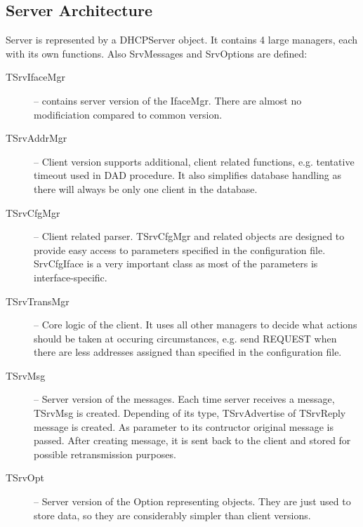 \subsection{Server Architecture}

Server is represented by a DHCPServer object. It contains 4 large
managers, each with its own functions. Also SrvMessages and SrvOptions
are defined:
\begin{description}
\item[TSrvIfaceMgr] -- contains server version of the IfaceMgr. There
  are almost no modificiation compared to common version.

\item[TSrvAddrMgr] -- Client version supports additional, client
  related functions, e.g. tentative timeout used in DAD procedure. It
  also simplifies database handling as there will always be only one
  client in the database.
\item[TSrvCfgMgr] -- Client related parser. TSrvCfgMgr and related
  objects are designed to provide easy access to parameters specified
  in the configuration file. SrvCfgIface is a very important class as
  most of the parameters is interface-specific.
\item[TSrvTransMgr] -- Core logic of the client. It uses all other
  managers to decide what actions should be taken at occuring
  circumstances, e.g. send REQUEST when there are less addresses
  assigned than specified in the configuration file.
\item[TSrvMsg] -- Server version of the messages. Each time server
  receives a message, TSrvMsg is created. Depending of its type,
  TSrvAdvertise of TSrvReply message is created. As parameter to its
  contructor original message is passed. After creating message, it is
  sent back to the client and stored for possible retransmission
  purposes.
\item[TSrvOpt] -- Server version of the Option representing
  objects. They are just used to store data, so they are considerably
  simpler than client versions.
\end{description}

